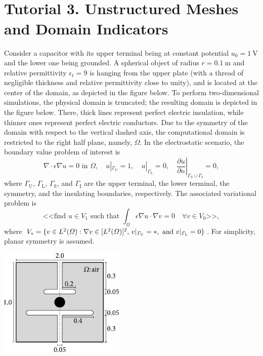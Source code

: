 \documentclass[9pt]{amsart}
\theoremstyle{remark}
\theoremstyle{definition}
\begin{document}
\section{\hrulefill\\Tutorial 3. Unstructured Meshes and Domain Indicators}
Consider a capacitor with its upper terminal being at constant potential $u_0=1~\mathrm{V}$ and the lower one being grounded. A spherical object of radius $r=0.1~\mathrm{m}$ and relative permittivity $\epsilon_\mathrm{r}=9$ is hanging from the upper plate (with a thread of negligible thickness and relative permittivity close to unity), and is located at the center of the domain, as depicted in the figure below. To perform two-dimensional simulations, the physical domain is truncated; the resulting domain is depicted in the figure below. There, thick lines represent perfect electric insulation, while thinner ones represent perfect electric conductors. Due to the symmetry of the domain with respect to the vertical dashed axis, the computational domain is restricted to the right half plane, namely, $\varOmega$. In the electrostatic scenario, the boundary value problem of interest is 
\[
\nabla\cdot\epsilon\nabla u =0\text{ in }\varOmega,\quad u|_{\varGamma_\mathrm{U}} = 1,\quad
u|_{\varGamma_\mathrm{L}} = 0,\quad\left.\frac{\partial u}{\partial n}\right|_{\varGamma_\mathrm{S}\cup\varGamma_\mathrm{I}} = 0,
\]
where $\varGamma_\mathrm{U}$, $\varGamma_\mathrm{L}$, $\varGamma_\mathrm{S}$, and $\varGamma_\mathrm{I}$ are the upper terminal, the lower terminal, the symmetry, and the insulating boundaries, respectively. The associated variational problem is 
\[
\text{<<find $u\in V_1$ such that }\int_\varOmega \epsilon\nabla u\cdot \nabla v=0\quad\forall v\in V_0\text{>>},
\]
where $V_\ast=\{v\in L^2(\varOmega):\nabla v\in [L^2(\varOmega)]^2\text,~v|_{\varGamma_\mathrm{U}}=\ast,\text{ and }v|_{\varGamma_\mathrm{L}}=0\}$. For simplicity, planar symmetry is assumed.\\
%
\begin{center}
\includegraphics[width=0.45\textwidth]{figs/12}
\end{center}
\end{document}
